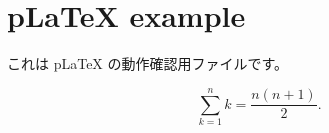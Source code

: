 \documentclass[dvipdfmx]{jsarticle}
\begin{document}
\section*{pLaTeX example}

これは pLaTeX の動作確認用ファイルです。

\[
  \sum_{k=1}^{n} k = \frac{n(n+1)}{2}.
\]
\end{document}
